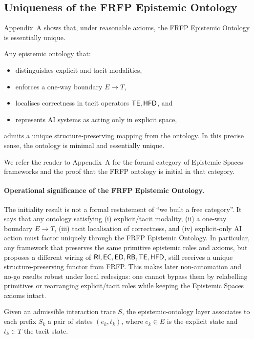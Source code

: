 \subsection{Uniqueness of the FRFP Epistemic Ontology}

Appendix~A shows that, under reasonable axioms, the FRFP Epistemic Ontology is essentially unique.

\begin{theorem}
Any epistemic ontology that:
\begin{itemize}[leftmargin=2em]
  \item distinguishes explicit and tacit modalities,
  \item enforces a one-way boundary \(E\to T\),
  \item localises correctness in tacit operators \(\mathsf{TE},\mathsf{HFD}\), and
  \item represents AI systems as acting only in explicit space,
\end{itemize}
admits a unique structure-preserving mapping from the \FRFP{} ontology. In this precise sense, the \FRFP{} ontology is minimal and essentially unique.
\end{theorem}

We refer the reader to Appendix~A for the formal category of Epistemic Spaces frameworks and the proof that the FRFP ontology is initial in that category.

\paragraph{Operational significance of the FRFP Epistemic Ontology.}
The initiality result is not a formal restatement of ``we built a free category''. It says that any ontology satisfying (i) explicit/tacit modality, (ii) a one-way boundary \(E\to T\), (iii) tacit localisation of correctness, and (iv) explicit-only AI action must factor uniquely through the FRFP Epistemic Ontology. In particular, any framework that preserves the same primitive epistemic roles and axioms, but proposes a different wiring of \(\mathsf{RI},\mathsf{EC},\mathsf{ED},\mathsf{RB},\mathsf{TE},\mathsf{HFD}\), still receives a unique structure-preserving functor from FRFP. This makes later non-automation and no-go results robust under local redesigns: one cannot bypass them by relabelling primitives or rearranging explicit/tacit roles while keeping the Epistemic Spaces axioms intact.

Given an admissible interaction trace \(S\), the epistemic-ontology layer associates to each prefix \(S_k\) a pair of states \((e_k,t_k)\), where \(e_k \in E\) is the explicit state and \(t_k \in T\) the tacit state.

